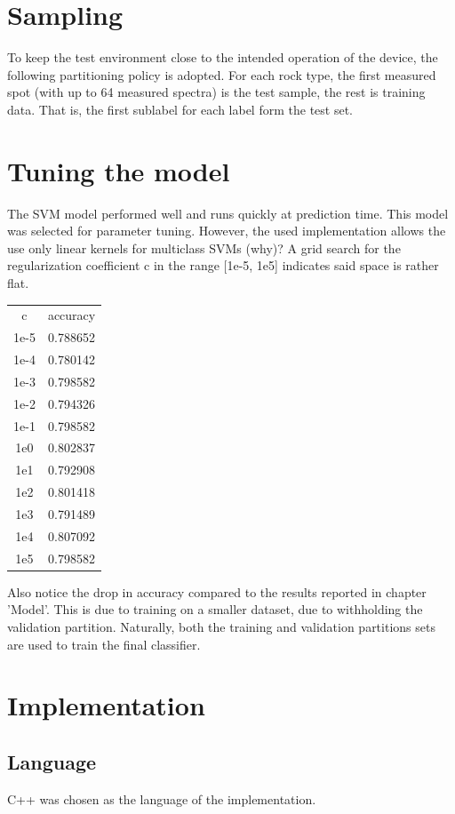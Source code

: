 \documentclass{article}
\begin{document}
\section{Sampling}
To keep the test environment close to the intended operation of the device, the following partitioning policy is adopted.
For each rock type, the first measured spot (with up to 64 measured spectra) is the test sample, the rest is training data.
That is, the first sublabel for each label form the test set.


\section{Tuning the model}
The SVM model performed well and runs quickly at prediction time.
This model was selected for parameter tuning.
However, the used implementation allows the use only linear kernels for multiclass SVMs (why)?
A grid search for the regularization coefficient c in the range [1e-5, 1e5] indicates said space is rather flat.

\begin{tabular}{ c | c }
c & accuracy  \\
1e-5 & 0.788652  \\
1e-4 & 0.780142  \\
1e-3 & 0.798582  \\
1e-2 & 0.794326  \\
1e-1 & 0.798582  \\
1e0 & 0.802837  \\
1e1 & 0.792908  \\
1e2 & 0.801418  \\
1e3 & 0.791489  \\
1e4 & 0.807092  \\
1e5 & 0.798582  \\
\end{tabular}

Also notice the drop in accuracy compared to the results reported in chapter 'Model'.
This is due to training on a smaller dataset, due to withholding the validation partition.
Naturally, both the training and validation partitions sets are used to train the final classifier.


\section{Implementation}
\subsection{Language}
C++ was chosen as the language of the implementation.
\end{document}
